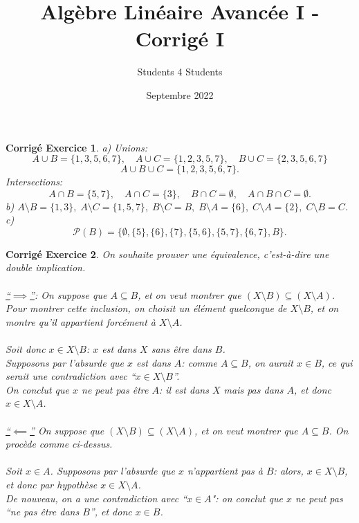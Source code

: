 \documentclass[11pt,french,table]{article}
\title{Algèbre Linéaire Avancée I - Corrigé I}
\author{Students 4 Students}
\date{Septembre 2022}
\theoremstyle{exercice}
\theoremstyle{corrigé}
\newtheorem{corrigé}{Corrigé Exercice}
\begin{document}
\maketitle
\vspace{1em}
\begin{corrigé}
a) Unions: \\
$$A \cup B = \{ 1,3,5,6,7 \}, \quad A \cup C = \{ 1,2,3,5,7 \}, \quad B \cup C = \{ 2,3,5,6,7 \}$$ $$A \cup B \cup C = \{ 1,2,3,5,6,7 \}.$$ Intersections: \\
$$A \cap B = \{ 5,7 \}, \quad A \cap C = \{ 3 \}, \quad B \cap C = \emptyset, \quad A \cap B \cap C = \emptyset.$$
\vspace{1em}
b) $A \setminus B = \{ 1,3 \}, \; A \setminus C = \{ 1,5,7 \}, \; B \setminus C = B, \; B \setminus A = \{ 6 \}, \; C \setminus A = \{ 2 \}, \; C \setminus B = C$.
c) $$\mathcal{P}(B) = \Big\{ \emptyset, \{5\},\{6\},\{7\},\{5,6\},\{5,7\},\{6,7\},B \Big\}.$$
\end{corrigé}
\vspace{2em}
\begin{corrigé}
On souhaite prouver une équivalence, c'est-à-dire une double implication. \\
\\
\underline{``$\implies$''}: On suppose que $A \subseteq B$, et on veut montrer que $(X \setminus B) \subseteq (X \setminus A)$. \\
Pour montrer cette inclusion, on choisit un élément quelconque de $X \setminus B$, et on montre qu'il appartient forcément à $X \setminus A$. \\
\\
Soit donc $x \in X \setminus B$: $x$ est dans $X$ sans être dans $B$. \\
Supposons par l'absurde que $x$ est dans $A$: comme $A \subseteq B$, on aurait $x \in B$, ce qui serait une contradiction avec ``$x \in X \setminus B$''. \\
On conclut que $x$ ne peut pas être $A$: il est dans $X$ mais pas dans $A$, et donc $x \in X \setminus A$. \\
\\
\underline{``$\impliedby$''} On suppose que $(X \setminus B) \subseteq (X \setminus A)$, et on veut montrer que $A \subseteq B$. On procède comme ci-dessus. \\
\\
Soit $x \in A$. Supposons par l'absurde que $x$ n'appartient pas à $B$: alors, $x \in X \setminus B$, et donc par hypothèse $x \in X \setminus A$. \\
De nouveau, on a une contradiction avec ``$x \in A$": on conclut que $x$ ne peut pas ``ne pas être dans $B$'', et donc $x \in B$.
\end{corrigé}
\end{document}
